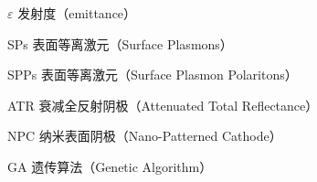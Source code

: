 \begin{denotation}[3cm]
\item[$\varepsilon$] 发射度（emittance）
\item[SPs] 表面等离激元（Surface Plasmons）
\item[SPPs] 表面等离激元（Surface Plasmon Polaritons）
\item[ATR] 衰减全反射阴极（Attenuated Total Reflectance）
\item[NPC] 纳米表面阴极（Nano-Patterned Cathode）
\item[GA] 遗传算法（Genetic Algorithm）
\end{denotation}
